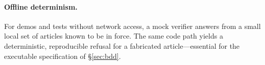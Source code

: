 \paragraph{Offline determinism.}
For demos and tests without network access, a mock verifier answers from a
small local set of articles known to be in force. The same code path yields a
deterministic, reproducible refusal for a fabricated article---essential for
the executable specification of \S\ref{sec:bdd}.
